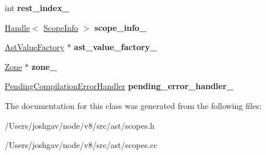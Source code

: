 \begin{DoxyCompactItemize}
\item 
int {\bfseries rest\+\_\+index\+\_\+}\hypertarget{classv8_1_1internal_1_1_scope_a04437e3a79db7c266ac224e7114b7853}{}\label{classv8_1_1internal_1_1_scope_a04437e3a79db7c266ac224e7114b7853}

\item 
\hyperlink{classv8_1_1internal_1_1_handle}{Handle}$<$ \hyperlink{classv8_1_1internal_1_1_scope_info}{Scope\+Info} $>$ {\bfseries scope\+\_\+info\+\_\+}\hypertarget{classv8_1_1internal_1_1_scope_a3a53ff212117f98292cf31609105b4d0}{}\label{classv8_1_1internal_1_1_scope_a3a53ff212117f98292cf31609105b4d0}

\item 
\hyperlink{classv8_1_1internal_1_1_ast_value_factory}{Ast\+Value\+Factory} $\ast$ {\bfseries ast\+\_\+value\+\_\+factory\+\_\+}\hypertarget{classv8_1_1internal_1_1_scope_abe77f56358647d61a1520ba1ba74a3e3}{}\label{classv8_1_1internal_1_1_scope_abe77f56358647d61a1520ba1ba74a3e3}

\item 
\hyperlink{classv8_1_1internal_1_1_zone}{Zone} $\ast$ {\bfseries zone\+\_\+}\hypertarget{classv8_1_1internal_1_1_scope_ae5019c99807bc01ae19990393a8bad4e}{}\label{classv8_1_1internal_1_1_scope_ae5019c99807bc01ae19990393a8bad4e}

\item 
\hyperlink{classv8_1_1internal_1_1_pending_compilation_error_handler}{Pending\+Compilation\+Error\+Handler} {\bfseries pending\+\_\+error\+\_\+handler\+\_\+}\hypertarget{classv8_1_1internal_1_1_scope_ab46d065fd30d077f2a3f9b6755c1e19b}{}\label{classv8_1_1internal_1_1_scope_ab46d065fd30d077f2a3f9b6755c1e19b}

\end{DoxyCompactItemize}


The documentation for this class was generated from the following files\+:\begin{DoxyCompactItemize}
\item 
/\+Users/joshgav/node/v8/src/ast/scopes.\+h\item 
/\+Users/joshgav/node/v8/src/ast/scopes.\+cc\end{DoxyCompactItemize}
